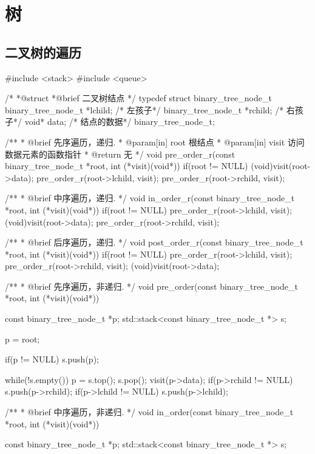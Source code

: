 \chapter{树}

\section{二叉树的遍历} %

\begin{Codex}[label=binary_tree.cpp]
#include <stack>
#include <queue>

 /*
  *@struct
  *@brief 二叉树结点
  */
typedef struct binary_tree_node_t {
    binary_tree_node_t *lchild;   /* 左孩子*/
    binary_tree_node_t *rchild;   /* 右孩子*/
    void* data; /* 结点的数据*/
}binary_tree_node_t;

/** 
  * @brief 先序遍历，递归.
  * @param[in] root 根结点
  * @param[in] visit 访问数据元素的函数指针
  * @return 无
  */
void pre_order_r(const binary_tree_node_t *root, 
                 int (*visit)(void*)) {
    if(root != NULL) {
        (void)visit(root->data);
        pre_order_r(root->lchild, visit);
        pre_order_r(root->rchild, visit);
    }
}

/** 
  * @brief 中序遍历，递归.
  */
void in_order_r(const binary_tree_node_t *root, 
                int (*visit)(void*)) {
    if(root != NULL) {
        pre_order_r(root->lchild, visit);
        (void)visit(root->data);
        pre_order_r(root->rchild, visit);
    }
}

/** 
  * @brief 后序遍历，递归.
  */
void post_order_r(const binary_tree_node_t *root, 
                  int (*visit)(void*)) {
    if(root != NULL) {
        pre_order_r(root->lchild, visit);
        pre_order_r(root->rchild, visit);
        (void)visit(root->data);
    }
}

/** 
 * @brief 先序遍历，非递归.
 */
void pre_order(const binary_tree_node_t *root, 
               int (*visit)(void*)) {
    const binary_tree_node_t *p;
    std::stack<const binary_tree_node_t *> s;

    p = root;

    if(p != NULL) {
        s.push(p);
    }

    while(!s.empty()) {
        p = s.top();
        s.pop();
        visit(p->data);
        if(p->rchild != NULL) {
            s.push(p->rchild);
        }
        if(p->lchild != NULL) {
            s.push(p->lchild);
        }
    }
}

/** 
 * @brief 中序遍历，非递归.
 */
void in_order(const binary_tree_node_t *root, 
              int (*visit)(void*)) {
    const binary_tree_node_t *p;
    std::stack<const binary_tree_node_t *> s;

}
\end{Codex}
